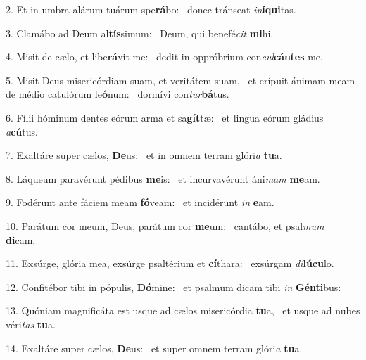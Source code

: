 2. Et in umbra alárum tuárum spe\textbf{rá}bo: \ast\  donec tránseat \textit{in}\textbf{í}\textbf{qui}tas.\

3. Clamábo ad Deum al\textbf{tís}simum: \ast\  Deum, qui benefé\textit{cit} \textbf{mi}hi.\

4. Misit de cælo, et libe\textbf{rá}vit me: \ast\  dedit in oppróbrium con\textit{cul}\textbf{cán}\textbf{tes} me.\

5. Misit Deus misericórdiam suam, et veritátem suam, \dag\  et erípuit ánimam meam de médio catulórum le\textbf{ó}num: \ast\  dormívi con\textit{tur}\textbf{bá}tus.\

6. Fílii hóminum dentes eórum arma et sa\textbf{gít}tæ: \ast\  et lingua eórum gládius \textit{a}\textbf{cú}tus.\

7. Exaltáre super cælos, \textbf{De}us: \ast\  et in omnem terram glóri\textit{a} \textbf{tu}a.\

8. Láqueum paravérunt pédibus \textbf{me}is: \ast\  et incurvavérunt áni\textit{mam} \textbf{me}am.\

9. Fodérunt ante fáciem meam \textbf{fó}veam: \ast\  et incidérunt \textit{in} \textbf{e}am.\

10. Parátum cor meum, Deus, parátum cor \textbf{me}um: \ast\  cantábo, et psal\textit{mum} \textbf{di}cam.\

11. Exsúrge, glória mea, exsúrge psaltérium et \textbf{cí}thara: \ast\  exsúrgam \textit{di}\textbf{lú}\textbf{cu}lo.\

12. Confitébor tibi in pópulis, \textbf{Dó}mine: \ast\  et psalmum dicam tibi \textit{in} \textbf{Gén}\textbf{ti}bus:\

13. Quóniam magnificáta est usque ad cælos misericórdia \textbf{tu}a, \ast\  et usque ad nubes véri\textit{tas} \textbf{tu}a.\

14. Exaltáre super cælos, \textbf{De}us: \ast\  et super omnem terram glóri\textit{a} \textbf{tu}a.\

